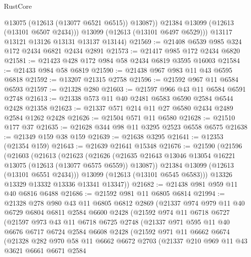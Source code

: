 \begin{lexlean}{RustCore}
\begin{coremodule}
              @13075
              (@12613 (@13077 @6521 @6515))
              @13087))
          @21384
          @13099
          (@12613 (@13101 @6507 @2434)))
        @13099
        (@12613 (@13101 @6497 @6529)))
      @13117
      @13121
      @13126
      @13131
      @13137
      @13144)
@21569 := @21408 @6539 @985 @324 @172 @2434 @6821 @2434 @2891
@21573 := @21417 @985 @172 @2434 @6820
@21581 := @21423 @428 @172 @984 @58 @2434 @6819 @3595 @16003
@21584 := @21433 @984 @58 @6819
@21590 := @21438 @967 @983 @11 @43 @6595 @6818
@21592 := @13207 @21315 @2758
@21596 := @21592 @967 @11 @6584 @6593
@21597 := @21328 @280
@21603 := @21597 @966 @43 @11 @6584 @6591 @2748
@21613 := @21338 @573 @11 @40 @2481 @6583 @6590 @2584 @6544 @2428 @21358
@21623 := @21337 @571 @214 @11 @27 @6580 @2434 @2489 @2584 @1262 @2428
@21626 := @21504 @571 @11 @6580
@21628 := @21510 @177 @37
@21635 := @21628 @344 @98 @11 @3295 @2523 @6558 @6575
@21638 := @21349 @159 @38 @159
@21639 := @21638 @3295
@21641 := @12353 (@21354 @159)
@21643 := @21639 @21641 @15348
@21676 := @21590
    (@21596
      (@21603
        (@21613
          (@21623
            (@21626
              (@21635 @21643 @13046 @13054 @16221 @13075 (@12613 (@13077 @6575 @6559)) @13087))
            @21384
            @13099
            (@12613 (@13101 @6551 @2434)))
          @13099
          (@12613 (@13101 @6545 @6583)))
        @13326
        @13329
        @13332
        @13336
        @13341
        @13347))
@21682 := @21438 @981 @959 @11 @40 @6816 @6488
@21686 := @21592 @981 @11 @6805 @6814
@21994 := @21328
    @278
    @980
    @43
    @11
    @6805
    @6812
    @2869
    (@21337
      @974
      @979
      @11
      @40
      @6729
      @6804
      @6811
      @2584
      @6600
      @2428
      (@21592
        @974
        @11
        @6718
        @6727
        (@21597
          @973
          @43
          @11
          @6718
          @6725
          @2748
          (@21337
            @971
            @595
            @11
            @40
            @6676
            @6717
            @6724
            @2584
            @6608
            @2428
            (@21592
              @971
              @11
              @6662
              @6674
              (@21328
                @282
                @970
                @58
                @11
                @6662
                @6672
                @2703
                (@21337
                  @210
                  @969
                  @11
                  @43
                  @3621
                  @6661
                  @6671
                  @2584

\end{coremodule}
\end{lexlean}

